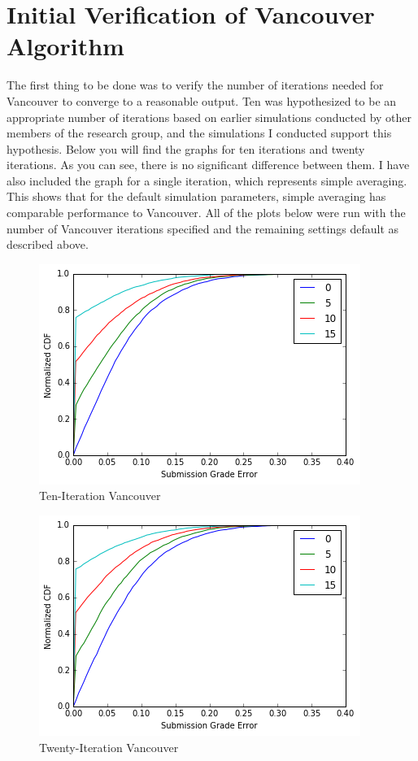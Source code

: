 \documentclass{article}
\begin{document}
	\section{Initial Verification of Vancouver Algorithm}
	The first thing to be done was to verify the number of iterations needed for Vancouver to converge to a reasonable output. Ten was hypothesized to be an appropriate number of iterations based on earlier simulations conducted by other members of the research group, and the simulations I conducted support this hypothesis. Below you will find the graphs for ten iterations and twenty iterations. As you can see, there is no significant difference between them. I have also included the graph for a single iteration, which represents simple averaging. This shows that for the default simulation parameters, simple averaging has comparable performance to Vancouver. All of the plots below were run with the number of Vancouver iterations specified and the remaining settings default as described above.
	
	\begin{figure}[h]
		\includegraphics{vancouver-10-steps.png}
		\caption{Ten-Iteration Vancouver}
	\end{figure}
	
	\begin{figure}[h]
		\includegraphics{vancouver-20-steps.png}
		\caption{Twenty-Iteration Vancouver}
	\end{figure}
	
\end{document}
